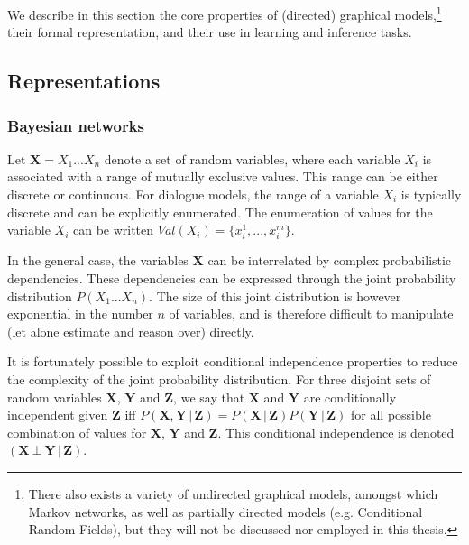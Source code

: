 We describe in this section the core properties of (directed) graphical models,\footnote{There also exists a variety of undirected graphical models, amongst which Markov networks, as well as partially directed models (e.g. Conditional Random Fields), but they will not be discussed nor employed in this thesis.} their formal representation, and their use in learning and inference tasks. 
 
 \subsection{Representations}
 \label{sec:gm-representation}
\subsubsection*{Bayesian networks}

Let $\mathbf{X} = X_1 ... X_n$ denote a set of random variables, where each variable $X_i$ is associated with a range of mutually exclusive values.  This range can be either discrete or continuous.  For dialogue models, the range of a variable $X_i$ is typically discrete and can be explicitly enumerated. The enumeration of values for the variable $X_i$ can be written $Val(X_i) = \{x_i^1, ..., x_i^m\}$.  

In the general case, the variables $\mathbf{X}$ can be interrelated by complex probabilistic dependencies.  These dependencies can be expressed through the joint probability distribution $P(X_1 ... X_n)$.  The size of this joint distribution is however exponential in the number $n$ of variables, and is therefore difficult to manipulate (let alone estimate and reason over) directly. 


It is fortunately possible to exploit conditional independence properties to reduce the complexity of the joint probability distribution.  For three disjoint sets of random variables $\mathbf{X}$, $\mathbf{Y}$ and $\mathbf{Z}$, we say that $\mathbf{X}$ and $\mathbf{Y}$ are conditionally independent given $\mathbf{Z}$ iff $P(\mathbf{X},\mathbf{Y} \, | \, \mathbf{Z}) = P(\mathbf{X} \, | \, \mathbf{Z}) P(\mathbf{Y} \, | \, \mathbf{Z})$ for all possible combination of values for  $\mathbf{X}$, $\mathbf{Y}$ and  $\mathbf{Z}$. This conditional independence is denoted $(\mathbf{X} \ \bot \  \mathbf{Y} \, | \,  \mathbf{Z})$. 

